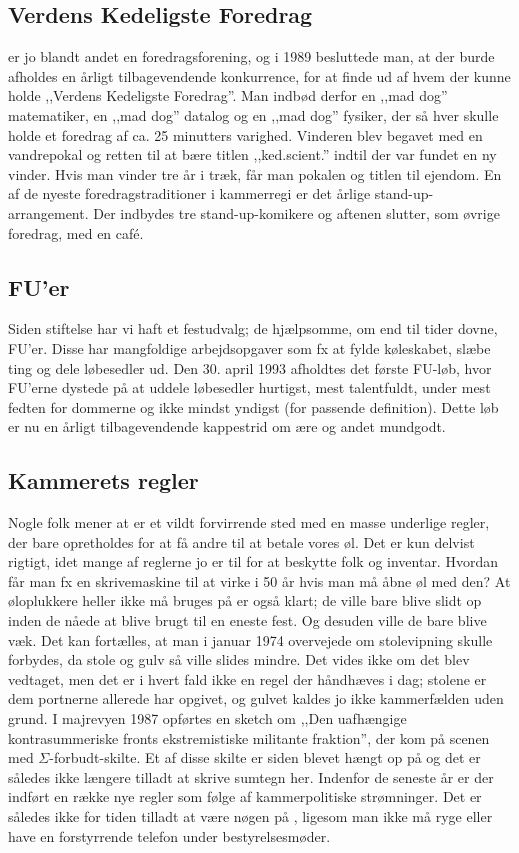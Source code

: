 \subsection{Verdens Kedeligste Foredrag}
\TKET er jo blandt andet en foredragsforening, og i 1989 besluttede man, at der burde afholdes en årligt tilbagevendende konkurrence, for at finde ud af hvem der kunne holde ,,Verdens Kedeligste Foredrag''. Man indbød derfor en ,,mad dog'' matematiker, en ,,mad dog'' datalog og en ,,mad dog'' fysiker, der så hver skulle holde et foredrag af ca. 25 minutters varighed. Vinderen blev begavet med en vandrepokal og retten til at bære titlen ,,ked.scient.'' indtil der var fundet en ny vinder. Hvis man vinder tre år i træk, får man pokalen og titlen til ejendom. En af de nyeste foredragstraditioner i kammerregi er det årlige stand-up-arrangement. Der indbydes tre stand-up-komikere og aftenen slutter, som øvrige foredrag, med en café.

\subsection{FU'er}
Siden \TKETs stiftelse har vi haft et festudvalg; de hjælpsomme, om end til tider dovne, FU'er. Disse har mangfoldige arbejdsopgaver som fx at fylde køleskabet, slæbe ting og dele løbesedler ud. Den 30. april 1993 afholdtes det første FU-løb, hvor FU'erne dystede på at uddele løbesedler hurtigst, mest talentfuldt, under mest fedten for dommerne og ikke mindst yndigst (for passende definition). Dette løb er nu en årligt tilbagevendende kappestrid om ære og andet mundgodt.

\subsection{Kammerets regler}
Nogle folk mener at \TKET er et vildt forvirrende sted med en masse underlige regler, der bare opretholdes for at få andre til at betale vores øl. Det er kun delvist rigtigt, idet mange af reglerne jo er til for at beskytte folk og inventar. Hvordan får man fx en skrivemaskine til at virke i 50 år hvis man må åbne øl med den? At øloplukkere heller ikke må bruges på \TKET er også klart; de ville bare blive slidt op inden de nåede at blive brugt til en eneste fest. Og desuden ville de bare blive væk. Det kan fortælles, at man i januar 1974 overvejede om stolevipning skulle forbydes, da stole og gulv så ville slides mindre. Det vides ikke om det blev vedtaget, men det er i hvert fald ikke en regel der håndhæves i dag; stolene er dem portnerne allerede har opgivet, og gulvet kaldes jo ikke kammerfælden uden grund. I majrevyen 1987 opførtes en sketch om ,,Den uafhængige kontrasummeriske fronts ekstremistiske militante fraktion'', der kom på scenen med $\Sigma$-forbudt-skilte. Et af disse skilte er siden blevet hængt op på \TKET og det er således ikke længere tilladt at skrive sumtegn her. Indenfor de seneste år er der indført en række nye regler som følge af kammerpolitiske strømninger. Det er således ikke for tiden tilladt at være nøgen på \TKET, ligesom man ikke må ryge eller have en forstyrrende telefon under bestyrelsesmøder.


